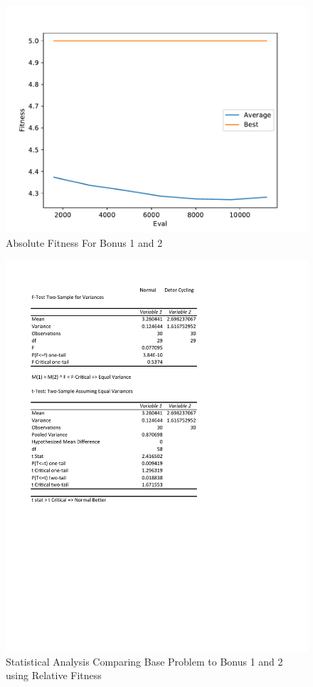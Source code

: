 \documentclass[times]{article}
\begin{document}
	\begin{figure}
		\caption{Absolute Fitness For Bonus 1 and 2}
		\label{fig:abs_bonus}
		\includegraphics[width=\textwidth]{../graph/absolute/7.pdf}
	\end{figure}

	\begin{figure}
		\caption{Statistical Analysis Comparing Base Problem to Bonus 1 and 2 using Relative Fitness}
		\label{fig:stat_rel_bonus}
		\includegraphics[width=\textwidth]{./pictures/stat_rel_bonus.pdf}
	\end{figure}
\end{document}
